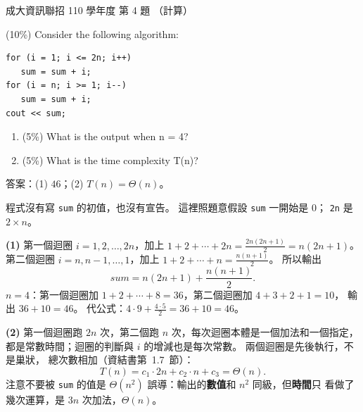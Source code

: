 \begin{pastexam}[label={px:ncku-110-prog-04}]{成大資訊聯招 110 學年度 第 4 題}
（計算）

(10\%) Consider the following algorithm:
\begin{verbatim}
for (i = 1; i <= 2n; i++)
   sum = sum + i;
for (i = n; i >= 1; i--)
   sum = sum + i;
cout << sum;
\end{verbatim}
\begin{enumerate}[label=(\arabic*),itemsep=0pt,topsep=2pt]
\item (5\%) What is the output when n = 4?
\item (5\%) What is the time complexity T(n)?
\end{enumerate}
\end{pastexam}

\begin{pastsoln}
答案：(1) $46$；(2) $T(n) = \Theta(n)$。

程式沒有寫 \texttt{sum} 的初值，也沒有宣告。 這裡照題意假設 \texttt{sum} 一開始是 $0$；
\texttt{2n} 是 $2 \times n$。

\textbf{(1)} 第一個迴圈 $i = 1, 2, \ldots, 2n$，加上 $1 + 2 + \cdots + 2n = \frac{2n(2n+1)}{2}
= n(2n + 1)$。 第二個迴圈 $i = n, n - 1, \ldots, 1$，加上 $1 + 2 + \cdots + n = \frac{n(n+1)}{2}$。
所以輸出
\[
\mathit{sum} = n(2n + 1) + \frac{n(n + 1)}{2}.
\]
$n = 4$：第一個迴圈加 $1 + 2 + \cdots + 8 = 36$，第二個迴圈加 $4 + 3 + 2 + 1 = 10$，
輸出 $36 + 10 = 46$。 代公式：$4 \cdot 9 + \frac{4 \cdot 5}{2} = 36 + 10 = 46$。

\textbf{(2)} 第一個迴圈跑 $2n$ 次，第二個跑 $n$ 次，每次迴圈本體是一個加法和一個指定，
都是常數時間；迴圈的判斷與 $i$ 的增減也是每次常數。 兩個迴圈是先後執行，不是巢狀，
總次數相加（資結書第~1.7~節）：
\[
T(n) = c_1 \cdot 2n + c_2 \cdot n + c_3 = \Theta(n).
\]
注意不要被 \texttt{sum} 的值是 $\Theta(n^2)$ 誤導：輸出的\textbf{數值}和 $n^2$ 同級，但\textbf{時間}只
看做了幾次運算，是 $3n$ 次加法，$\Theta(n)$。
\end{pastsoln}

